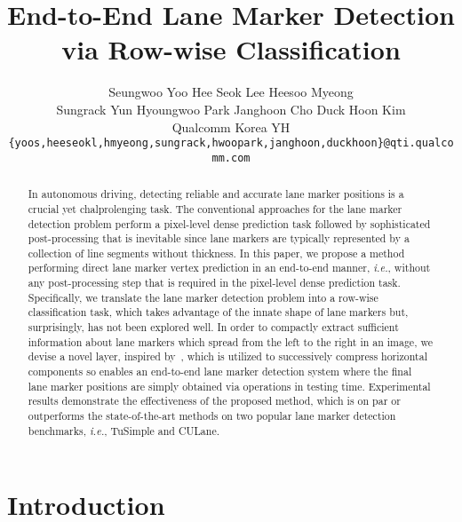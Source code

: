 \documentclass[10pt,twocolumn,letterpaper]{article}
\begin{document}
\title{End-to-End Lane Marker Detection via Row-wise Classification}



\author{Seungwoo Yoo \quad Hee Seok Lee \quad Heesoo Myeong \\ \vspace{3.px} \quad Sungrack Yun \quad Hyoungwoo Park \quad Janghoon Cho \quad Duck Hoon Kim \vspace{3mm} \\
Qualcomm Korea YH\\
{\tt\small \{yoos,heeseokl,hmyeong,sungrack,hwoopark,janghoon,duckhoon\}@qti.qualcomm.com}
}

\maketitle


\def\algorithmname{E2E-LMD}

\begin{abstract}
In autonomous driving, detecting reliable and accurate lane marker positions is a crucial yet chalprolenging task. The conventional approaches for the lane marker detection problem perform a pixel-level dense prediction task followed by sophisticated post-processing that is inevitable since lane markers are typically represented by a collection of line segments without thickness. In this paper, we propose a method performing direct lane marker vertex prediction in an end-to-end manner, \textit{i.e.}, without any post-processing step that is required in the pixel-level dense prediction task. Specifically, we translate the lane marker detection problem into a row-wise classification task, which takes advantage of the innate shape of lane markers but, surprisingly, has not been explored well. In order to compactly extract sufficient information about lane markers which spread from the left to the right in an image, we devise a novel layer, inspired by~\cite{Drivable}, which is utilized to successively compress horizontal components so enables an end-to-end lane marker detection system where the final lane marker positions are simply obtained via  operations in testing time. Experimental results demonstrate the effectiveness of the proposed method, which is on par or outperforms the state-of-the-art methods on two popular lane marker detection benchmarks, \textit{i.e.}, TuSimple and CULane.
\end{abstract}

\section{Introduction}
\end{document}
